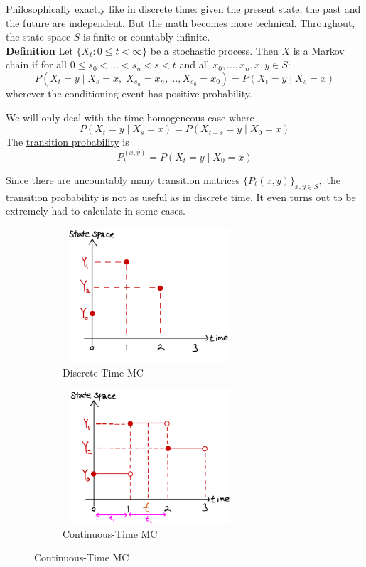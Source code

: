 \documentclass[12pt]{article}
\begin{document}
\newcommand\independent{\protect\mathpalette{\protect\independenT}{\perp}}
\def\independenT#1#2{\mathrel{\rlap{$#1#2$}\mkern2mu{#1#2}}}


Philosophically exactly like in discrete time: given the present state, the past and the future are independent. But the math becomes more technical. Throughout, the state space $S$ is finite or countably infinite.\\

{\bf Definition} Let $\{X_t:0\le t< \infty\}$ be a stochastic process. Then $X$ is a Markov chain if for all $0\le s_0<\ldots<s_n<s<t$ and all $x_0,\ldots,x_n,x,y\in S:$
$$P(X_t=y\;|\;X_s=x,\;X_{s_n}=x_n,\ldots,X_{s_0}=x_0) = P(X_t=y\;|\;X_s=x)$$ 
wherever the conditioning event has positive probability.

\vspace{1\baselineskip}
We will only deal with the time-homogeneous case where
$$P(X_t=y\;|\;X_s=x) = P(X_{t-s}=y\;|\;X_0=x)$$
The \underline{transition probability} is 
$$P_t^{(x,y)} = P(X_t=y\;|\;X_0=x)$$

Since there are \underline{uncountably} many transition matrices $\{P_t(x,y)\}_{x,y\in S},$ the transition probability is not as useful as in discrete time. It even turns out to be extremely had to calculate in some cases.


\begin{figure}[!htbp]
    \centering
    \begin{subfigure}[b]{0.3\textwidth}
        \includegraphics[height=5cm, width=6.5cm]{CTMC_1.jpeg}
        \caption{Discrete-Time MC}
    \end{subfigure}\qquad\qquad
    \begin{subfigure}[b]{0.3\textwidth}
        \includegraphics[height=5cm, width=6.5cm]{CTMC_2.jpeg}
        \caption{Continuous-Time MC}
    \end{subfigure}
\end{figure}
\end{document}
